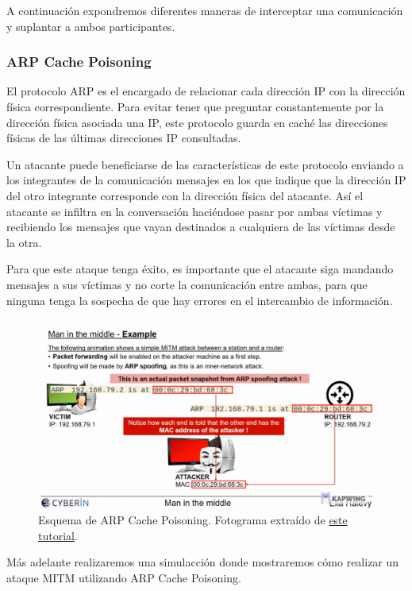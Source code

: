 \documentclass[11pt]{article}
\begin{document}
 A continuación expondremos diferentes maneras de interceptar una comunicación y suplantar a ambos participantes. 
 
 \subsubsection*{ARP Cache Poisoning}
 
 El protocolo ARP es el encargado de relacionar cada dirección IP con la dirección física correspondiente. Para evitar tener que preguntar constantemente por la dirección física asociada una IP, este protocolo guarda en caché las direcciones físicas de las últimas direcciones IP consultadas.
 
 Un atacante puede beneficiarse de las características de este protocolo enviando a los integrantes de la comunicación mensajes en los que indique que la dirección IP del otro integrante corresponde con la dirección física del atacante. Así el atacante se infiltra en la conversación haciéndose pasar por ambas víctimas y recibiendo los mensajes que vayan destinados a cualquiera de las víctimas desde la otra. 
 
 Para que este ataque tenga éxito, es importante que el atacante siga mandando mensajes a sus víctimas y no corte la comunicación entre ambas, para que ninguna tenga la sospecha de que hay errores en el intercambio de información.
 
 \begin{figure}[H]
 	\centering
 	\includegraphics[width=120mm]{images/esquema-arp}
 	\caption{Esquema de ARP Cache Poisoning. Fotograma extraído de \href{https://www.youtube.com/watch?v=fbXu8EX0hsI}{este tutorial}.}
 \end{figure}

	Más adelante realizaremos una simulacción donde mostraremos cómo realizar un ataque MITM utilizando ARP Cache Poisoning.
\end{document}
